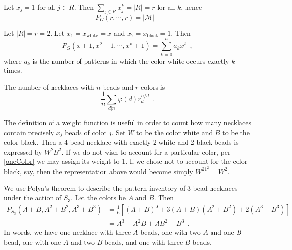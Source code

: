 \begin{corollary}
	\cite[89]{Aigner2007}
	\cite[254]{Tucker1974}
	Let $x_j = 1$ for all $j \in R$. Then $\sum_{j \in R} x_j^k = |R| = r$ for all $k$, hence
	\begin{equation}
		P_G(r, \cdots, r) = |\mathcal{M}| \enspace.
	\end{equation}
\end{corollary}

\begin{corollary}
	\label{oneColor}
	\cite[89]{Aigner2007}
	Let $|R| = r = 2$. Let $x_1 = x_{\text{white}} = x$ and
	$x_2 = x_{\text{black}} = 1$. Then
	\begin{equation}
		P_G(x + 1, x^2 + 1, \cdots, x^n + 1) = \sum_{k = 0}^n a_k x^k \enspace,
	\end{equation}
	where $a_k$ is the number of patterns in which the color white occurs exactly $k$ times.
\end{corollary}

\begin{example}
	\cite[89]{Aigner2007}
	The number of necklaces with $n$ beads and $r$ colors is
	\begin{equation}
		\frac{1}{n} \sum_{d | n} \varphi(d) r_d^{n / d} \enspace.
	\end{equation}
\end{example}

\begin{example}
	\cite[86]{Aigner2007}
	The definition of a weight function is useful in order to count how many necklaces
	contain precisely $x_j$ beads of color $j$. Set $W$ to be the color white and $B$
	to be the color black. Then a 4-bead necklace with exactly 2 white and 2 black beads
	is expressed by $W^2B^2$. If we do not wish to account for a particular color,
	per \ref{oneColor} we may assign its weight to 1. If we chose not to account for the color
	black, say, then the representation above would become simply $W^21^2 = W^2$.
\end{example}

\begin{example}
	We use Polya's theorem to describe the pattern inventory of 3-bead necklaces under
	the action of $S_3$. Let the colors be $A$ and $B$. Then
		\begin{align}
			P_{S_3}(A + B, A^2 + B^2, A^3 + B^3)
			& = \frac{1}{6}[(A + B)^3 + 3 (A + B) (A^2 + B^2) + 2 (A^3 + B^3)] \\
			& = A^3 + A^2 B + A B^2 + B^3 \enspace.
		\end{align}
	In words, we have one necklace with three $A$ beads, one with two $A$ and one $B$ bead,
	one with one $A$ and two $B$ beads, and one with three $B$ beads.
\end{example}

